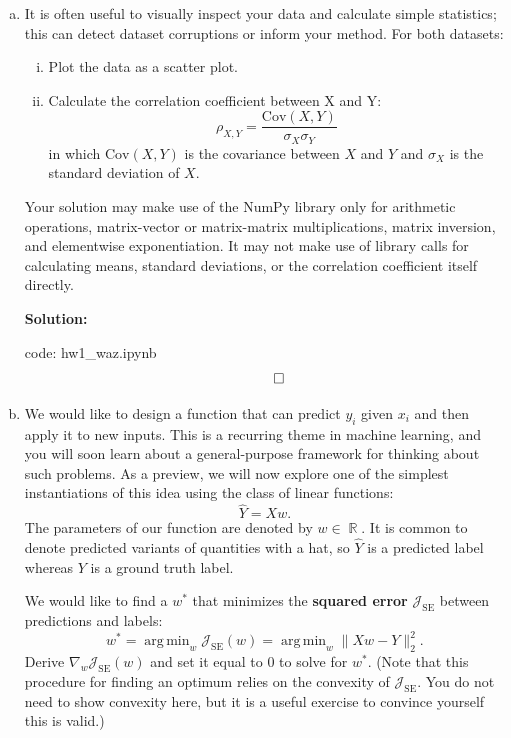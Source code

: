 \documentclass{article}
\DeclareMathOperator{\R}{\mathbb{R}}
\DeclareMathOperator*{\argmin}{arg\,min}
\newenvironment{solution}{\color{blue} \smallskip \textbf{Solution:}}{}
\begin{document}
\begin{enumerate}[(a)]

    \item 
    It is often useful to visually inspect your data and calculate simple statistics; this can detect dataset corruptions or inform your method. 
    For both datasets:
    \begin{enumerate}[(i)]
        \item Plot the data as a scatter plot.
        \item 
        Calculate the correlation coefficient between X and Y:
        \[
            \rho_{X,Y} = \frac{\text{Cov}(X, Y)}{\sigma_X \sigma_Y}
        \]
        in which $\text{Cov}(X, Y)$ is the covariance between $X$ and $Y$ and $\sigma_X$ is the standard deviation of $X$.
    \end{enumerate}
    Your solution may make use of the NumPy library only for arithmetic operations, matrix-vector or matrix-matrix multiplications, matrix inversion, and elementwise exponentiation. 
    It may not make use of library calls for calculating means, standard deviations, or the correlation coefficient itself directly.

    \begin{solution}
        
        code: hw1\_waz.ipynb
        \[ \qedhere \]
    \end{solution}

    \item
    We would like to design a function that can predict $y_i$ given $x_i$ and then apply it to new inputs. 
    This is a recurring theme in machine learning, and you will soon learn about a general-purpose framework for thinking about such problems. 
    As a preview, we will now explore one of the simplest instantiations of this idea using the class of linear functions:
    \begin{equation}
    \label{eq:y_hat}
        \hat{Y} = X w.
    \end{equation}
    The parameters of our function are denoted by $w \in \R$. 
    It is common to denote predicted variants of quantities with a hat, so $\hat{Y}$ is a predicted label whereas $Y$ is a ground truth label.
    
    We would like to find a $w^*$ that minimizes the \textbf{squared error} $\mathcal{J}_\text{SE}$ between predictions and labels:
    \[
        w^* = \argmin_{w} \mathcal{J}_\text{SE}(w) = \argmin_w \| Xw - Y \|_2^2.
    \]
    Derive $\nabla_w \mathcal{J}_\text{SE}(w)$ and set it equal to 0 to solve for $w^*$. 
    (Note that this procedure for finding an optimum relies on the convexity of $\mathcal{J}_\text{SE}$. You do not need to show convexity here, but it is a useful exercise to convince yourself this is valid.)


\end{enumerate}
\end{document}
